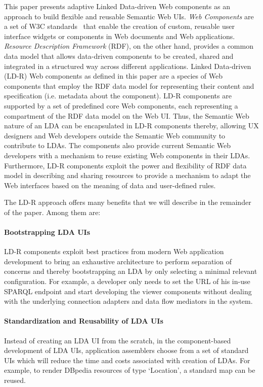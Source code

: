 \documentclass{acm_proc_article-sp}
\begin{document}
This paper presents adaptive Linked Data-driven Web components as an approach to build flexible and reusable Semantic Web UIs.
\emph{Web Components} are a set of W3C standards~\cite{webcomponentsW3C} that enable the creation of custom, reusable user interface widgets or components in Web documents and Web applications.  
\emph{Resource Description Framework} (RDF), on the other hand, provides a common data model that allows data-driven components to be created, shared and integrated in a structured way across different applications.
Linked Data-driven (LD-R) Web components as defined in this paper are a species of Web components that employ the RDF data model for representing their content and specification (i.e. metadata about the component).
LD-R components are supported by a set of predefined core Web components, each representing a compartment of the RDF data model on the Web UI.
Thus, the Semantic Web nature of an LDA can be encapsulated in LD-R components thereby, allowing UX designers and Web developers outside the Semantic Web community to contribute to LDAs.
The components also provide current Semantic Web developers with a mechanism to reuse existing Web components in their LDAs.
Furthermore, LD-R components exploit the power and flexibility of RDF data model in describing and sharing resources to provide a mechanism to adapt the Web interfaces based on the meaning of data and user-defined rules. 

The LD-R approach offers many benefits that we will describe in the remainder of the paper. Among them are:

\paragraph{Bootstrapping LDA UIs} 
LD-R components exploit best practices from modern Web application development to bring an exhaustive architecture to perform separation of concerns and thereby bootstrapping an LDA by only selecting a minimal relevant configuration.
For example, a developer only needs to set the URL of his in-use SPARQL endpoint and start developing the viewer components without dealing with the underlying connection adapters and data flow mediators in the system.

\paragraph{Standardization and Reusability of LDA UIs} 
Instead of creating an LDA UI from the scratch, in the component-based development of LDA UIs, application assemblers choose from a set of standard UIs which will reduce the time and costs associated with creation of LDAs.
For example, to render DBpedia resources of type `Location', a standard map can be reused.
\end{document}
